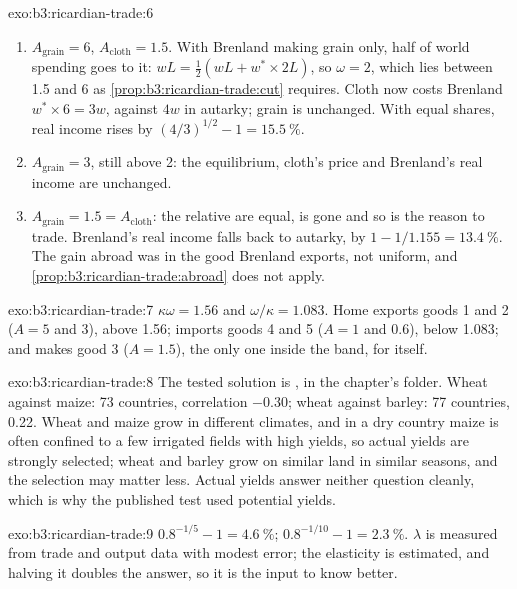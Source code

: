 \begin{solution}{exo:b3:ricardian-trade:6}
\begin{enumerate}
\item $A_{\text{grain}} = 6$, $A_{\text{cloth}} = 1.5$. With Brenland making grain only,
half of world spending goes to it: $wL = \tfrac12(wL + w^* \times 2L)$, so $\omega = 2$,
which lies between 1.5 and 6 as \cref{prop:b3:ricardian-trade:cut} requires. Cloth
now costs Brenland $w^* \times 6 = 3w$, against $4w$ in autarky; grain is unchanged.
With equal shares, real income rises by $(4/3)^{1/2} - 1 = 15.5~\%$.
\item $A_{\text{grain}} = 3$, still above 2: the equilibrium, cloth's price and
Brenland's real income are unchanged.
\item $A_{\text{grain}} = 1.5 = A_{\text{cloth}}$: the relative  are equal,
 is gone and so is the reason to trade. Brenland's real
income falls back to autarky, by $1 - 1/1.155 = 13.4~\%$. The gain abroad was in
the good Brenland exports, not uniform, and
\cref{prop:b3:ricardian-trade:abroad} does not apply.
\end{enumerate}
\end{solution}

\begin{solution}{exo:b3:ricardian-trade:7}
$\kappa\omega = 1.56$ and $\omega/\kappa = 1.083$. Home exports goods 1 and 2 ($A = 5$ and
3), above 1.56; imports goods 4 and 5 ($A = 1$ and 0.6), below 1.083; and makes good 3
($A = 1.5$), the only one inside the band, for itself.
\end{solution}

\begin{solution}{exo:b3:ricardian-trade:8}
The tested solution is , in the chapter's 
folder. Wheat against maize: 73 countries, correlation $-0.30$; wheat against
barley: 77 countries, 0.22. %
Wheat and maize grow in different climates, and in a dry country maize is
often confined to a few irrigated fields with high yields, so actual yields
are strongly selected; wheat and barley grow on similar land in similar seasons,
and the selection may matter less. Actual yields answer neither question
cleanly, which is why the published test used potential yields.
\end{solution}

\begin{solution}{exo:b3:ricardian-trade:9}
$0.8^{-1/5} - 1 = 4.6~\%$; $0.8^{-1/10} - 1 = 2.3~\%$. $\lambda$ is measured from trade and
output data with modest error; the elasticity is estimated, and halving it
doubles the answer, so it is the input to know better.
\end{solution}

